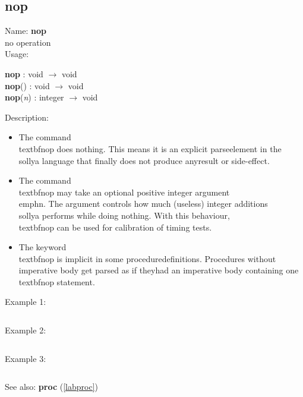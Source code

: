 \subsection{nop}
\label{labnop}
\noindent Name: \textbf{nop}\\
no operation\\
\noindent Usage: 
\begin{center}
\textbf{nop} : \textsf{void} $\rightarrow$ \textsf{void}\\
\textbf{nop}() : \textsf{void} $\rightarrow$ \textsf{void}\\
\textbf{nop}(\emph{n}) : \textsf{integer} $\rightarrow$ \textsf{void}\\
\end{center}
\noindent Description: \begin{itemize}

\item The command \\textbf{nop} does nothing. This means it is an explicit parse\n   element in the \\sollya language that finally does not produce any\n   result or side-effect.\n
\item The command \\textbf{nop} may take an optional positive integer argument \\emph{n}. The argument controls how much (useless) integer additions \\sollya performs while doing nothing. \n   With this behaviour, \\textbf{nop} can be used for calibration of timing tests.\n
\item The keyword \\textbf{nop} is implicit in some procedure\n   definitions. Procedures without imperative body get parsed as if they\n   had an imperative body containing one \\textbf{nop} statement.\n\end{itemize}
\noindent Example 1: 
\begin{center}\begin{minipage}{15cm}\begin{Verbatim}[frame=single]
\end{Verbatim}
\end{minipage}\end{center}
\noindent Example 2: 
\begin{center}\begin{minipage}{15cm}\begin{Verbatim}[frame=single]
\end{Verbatim}
\end{minipage}\end{center}
\noindent Example 3: 
\begin{center}\begin{minipage}{15cm}\begin{Verbatim}[frame=single]
\end{Verbatim}
\end{minipage}\end{center}
See also: \textbf{proc} (\ref{labproc})
